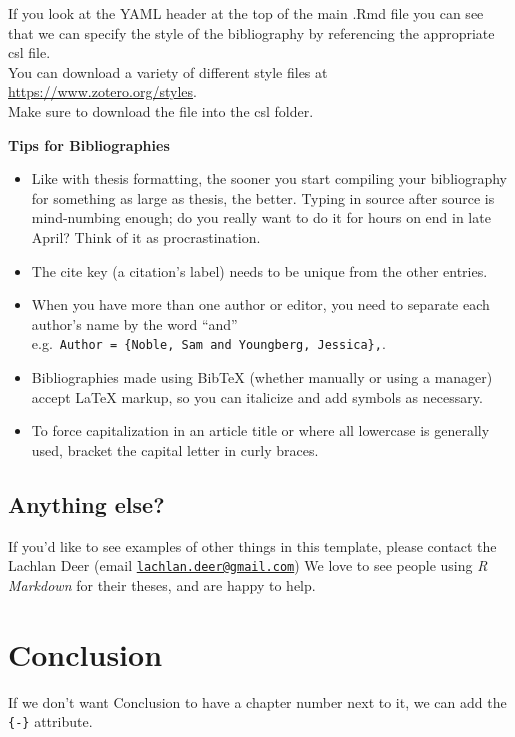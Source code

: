 \documentclass[12pt,oneside]{tisemthesis}
\providecommand{\tightlist}{%
  \setlength{\itemsep}{0pt}\setlength{\parskip}{0pt}}
\begin{document}
If you look at the YAML header at the top of the main .Rmd file you can see that we can specify the style of the bibliography by referencing the appropriate csl file.\\
You can download a variety of different style files at \url{https://www.zotero.org/styles}.\\
Make sure to download the file into the csl folder.

\vfill

\textbf{Tips for Bibliographies}
\begin{itemize}
\tightlist
\item
  Like with thesis formatting, the sooner you start compiling your bibliography for something as large as thesis, the better. Typing in source after source is mind-numbing enough; do you really want to do it for hours on end in late April? Think of it as procrastination.
\item
  The cite key (a citation's label) needs to be unique from the other entries.
\item
  When you have more than one author or editor, you need to separate each author's name by the word ``and'' e.g.~\texttt{Author\ =\ \{Noble,\ Sam\ and\ Youngberg,\ Jessica\},}.
\item
  Bibliographies made using BibTeX (whether manually or using a manager) accept LaTeX markup, so you can italicize and add symbols as necessary.
\item
  To force capitalization in an article title or where all lowercase is generally used, bracket the capital letter in curly braces.
\end{itemize}
\hypertarget{anything-else}{%
\section{Anything else?}\label{anything-else}}

If you'd like to see examples of other things in this template, please contact the Lachlan Deer (email \href{mailto:lachlan.deer@gmail.com}{\nolinkurl{lachlan.deer@gmail.com}})
We love to see people using \emph{R Markdown} for their theses, and are happy to help.

\hypertarget{conclusion}{%
\chapter*{Conclusion}\label{conclusion}}

If we don't want Conclusion to have a chapter number next to it, we can add the \texttt{\{-\}} attribute.
\end{document}
